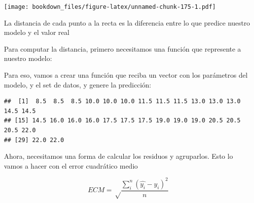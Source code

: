 \documentclass[]{book}
\newenvironment{Shaded}{\begin{snugshade}}{\end{snugshade}}
\newcommand{\ControlFlowTok}[1]{\textcolor[rgb]{0.13,0.29,0.53}{\textbf{#1}}}
\newcommand{\DecValTok}[1]{\textcolor[rgb]{0.00,0.00,0.81}{#1}}
\newcommand{\FloatTok}[1]{\textcolor[rgb]{0.00,0.00,0.81}{#1}}
\newcommand{\KeywordTok}[1]{\textcolor[rgb]{0.13,0.29,0.53}{\textbf{#1}}}
\newcommand{\NormalTok}[1]{#1}
\newcommand{\OperatorTok}[1]{\textcolor[rgb]{0.81,0.36,0.00}{\textbf{#1}}}
\newcommand{\StringTok}[1]{\textcolor[rgb]{0.31,0.60,0.02}{#1}}
\begin{document}
\texttt{[image: bookdown\_files/figure-latex/unnamed-chunk-175-1.pdf]}

La distancia de cada punto a la recta es la diferencia entre lo que predice nuestro modelo y el valor real

Para computar la distancia, primero necesitamos una función que represente a nuestro modelo:

Para eso, vamos a crear una función que reciba un vector con los parámetros del modelo, y el set de datos, y genere la predicción:

\begin{Shaded}
\end{Shaded}

\begin{verbatim}
##  [1]  8.5  8.5  8.5 10.0 10.0 10.0 11.5 11.5 11.5 13.0 13.0 13.0 14.5 14.5
## [15] 14.5 16.0 16.0 16.0 17.5 17.5 17.5 19.0 19.0 19.0 20.5 20.5 20.5 22.0
## [29] 22.0 22.0
\end{verbatim}

Ahora, necesitamos una forma de calcular los residuos y agruparlos. Esto lo vamos a hacer con el error cuadrático medio

\[ECM = \sqrt\frac{\sum_i^n{(\hat{y_i} - y_i)^2}}{n}\]

\begin{Shaded}
\end{Shaded}
\end{document}
